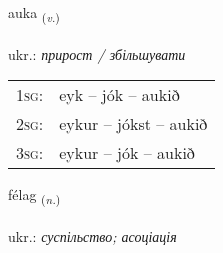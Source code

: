 \documentclass[frontgrid, backgrid]{flacards}\usepackage[]{graphicx}\usepackage[]{xcolor}
\begin{document}
\renewcommand{\blhead}{\vskip5pt {\small\bfseries\footnotesize Sagnorð | дієслово }}
\renewcommand{\bcfoot}{\vskip5pt \hspace{2pt}{\small\bfseries\footnotesize 1K}}


{auka \small{\textsubscript{(\textit{v.})}} \\[1ex] %
\textphonetic{[œiːka]} \\
ukr.: \emph{прирост / збільшувати} \\  [2ex]
\renewcommand*{\arraystretch}{0.8}
\begin{tabular}{p{1cm}l}
\textsc{1sg}: & eyk -- jók -- aukið \\ 
\textsc{2sg}: & eykur -- jókst -- aukið \\ 
\textsc{3sg}: & eykur -- jók -- aukið \\ 
\end{tabular}
}

\renewcommand{\flhead}{\vskip5pt \fboxsep=0pt {\small\bfseries\footnotesize Nafnorð | іменник}}
\renewcommand{\fcfoot}{\vskip5pt \fboxsep=0pt \hspace{2pt}{\small\bfseries\footnotesize 1K}}

\renewcommand{\blhead}{\vskip5pt {\small\bfseries\footnotesize Nafnorð | іменник }}
\renewcommand{\bcfoot}{\vskip5pt \hspace{2pt}{\small\bfseries\footnotesize 1K}}


{félag \small{\textsubscript{(\textit{n.})}} \\[1ex] %
\textphonetic{[fjɛːlaɣ]} \\
ukr.: \emph{суспільство; асоціація} \\  [2ex]
\renewcommand*{\arraystretch}{0.8}
}

\renewcommand{\flhead}{\vskip5pt \fboxsep=0pt {\small\bfseries\footnotesize Nafnorð | іменник}}
\renewcommand{\fcfoot}{\vskip5pt \fboxsep=0pt \hspace{2pt}{\small\bfseries\footnotesize 1K}}
\end{document}
